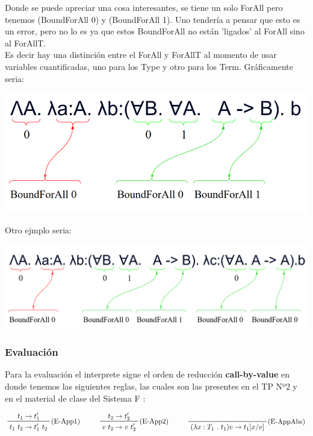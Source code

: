 \documentclass[12pt, titlepage, a4paper]{article}
\begin{document}
Donde se puede apreciar una cosa interesantes, se tiene un solo ForAll pero tenemos (BoundForAll 0) y (BoundForAll 1). Uno tendería a 
pensar que esto es un error, pero no lo es ya que estos BoundForAll no están 'ligados' al ForAll sino al ForAllT.\\

Es decir hay una distinción entre el ForAll y ForAllT al momento de usar variables cuantificadas, uno para los Type y otro para 
los Term. Gráficamente seria:

\begin{center}
  \includegraphics[width=.8\textwidth]{Imagenes/EjemploBoundForAllFunction.png}
\end{center}

\noindent Otro ejmplo seria:
\begin{center}
  \includegraphics[width=.9\textwidth]{Imagenes/EjemploBoundForAllFunction2.png}
\end{center}


\subsubsection{Evaluación}
Para la evaluación el interprete sigue el orden de reducción \textbf{call-by-value} en donde tenemos las siguientes reglas, las cuales 
son las presentes en el TP Nº2 \cite{tp2:lambdaCalculoSimpleTipado} y en el material de clase del Sistema F \cite{ALP:Polimorfismo}:

\begin{displaymath}
    \prftree[r]{(E-App1)}{t_1 \rightarrow t_1'}{t_1 \ t_2 \rightarrow t_1' \ t_2}  \hspace{1cm}
    \prftree[r]{(E-App2)}{t_2 \rightarrow t_2'}{v \ t_2 \rightarrow v \ t_2'}  \hspace{1cm}
    \prftree[r]{(E-AppAbs)}{}{(\lambda x : T_1 \ . \ t_1 ) v \rightarrow t_1[x/v]}
\end{displaymath}
\end{document}
